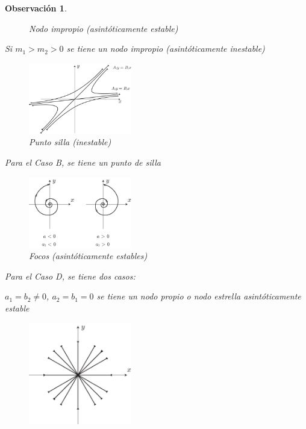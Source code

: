 \documentclass[a5paper,doc,10pt,noapacite]{apa6}
\newtheorem{observ}{Observación}
\begin{document}
{{\begin{observ}
\begin{figure}[H]
		\caption{Nodo impropio (asintóticamente estable)}
		\label{fig:M-11}
	\end{figure}
	
	Si \(m_1>m_2>0\) se tiene un nodo impropio (asintóticamente inestable)
	\vspace{-1\baselineskip}
	\begin{figure}[H]
		\captionsetup{justification=centering, labelfont=footnotesize, font=footnotesize}
		\centering
		\includegraphics[width=4.5cm]{Graficos/figura12}
	
		\caption{Punto silla (inestable)}
		\label{fig:M-12}
	\end{figure}
	
	Para el Caso B, se tiene un punto de silla
	\vspace{-1\baselineskip}
	\begin{figure}[H]
		\captionsetup{justification=centering, labelfont=footnotesize, font=footnotesize}
		\centering
		\includegraphics[width=4.5cm]{Graficos/figura13}
	
		\caption{Focos (asintóticamente estables)}
		\label{fig:M-13}
	\end{figure}
	
	Para el Caso D, se tiene  dos casos:
	\begin{APAenumerate}
		\item \(a_1=b_2\neq 0\), \(a_2=b_1=0\) se tiene un nodo propio o nodo estrella asintóticamente estable
		\vspace{-1\baselineskip}
	\begin{figure}[H]
		\captionsetup{justification=centering, labelfont=footnotesize, font=footnotesize}
		\centering
		\includegraphics[width=4.5cm]{Graficos/figura14}
	

\end{figure}
\end{APAenumerate}
\end{observ}}}
\end{document}
